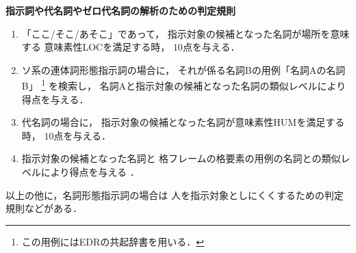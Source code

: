 {
{\bf 指示詞や代名詞やゼロ代名詞の解析のための判定規則}
\begin{enumerate}

\item 「ここ/そこ/あそこ」であって，
  指示対象の候補となった名詞が場所を意味する
  意味素性LOCを満足する時， $10$点を与える．

\item ソ系の連体詞形態指示詞の場合に，
  それが係る名詞Bの用例「名詞Aの名詞B」
  \footnote{
    この用例にはEDRの共起辞書\cite{edr_kyouki_2.1}を用いる． } を検索し，
  名詞Aと指示対象の候補となった名詞の類似レベルにより得点を与える．

\item 代名詞の場合に，
  指示対象の候補となった名詞が意味素性HUMを満足する時，
  $10$点を与える．

\item 指示対象の候補となった名詞と
  格フレームの格要素の用例の名詞との類似レベルにより得点を与える
  \cite{Murata_ipal95}．


\end{enumerate}

以上の他に，名詞形態指示詞の場合は
人を指示対象としにくくするための判定規則などがある．

}

